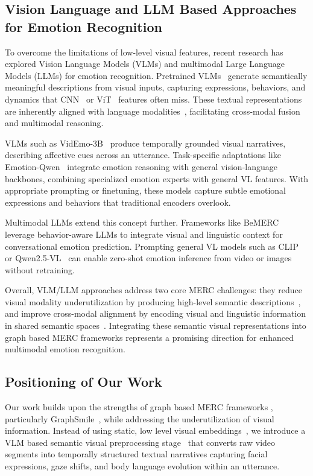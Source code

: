 \documentclass[runningheads]{llncs}
\begin{document}
\subsection{Vision Language and LLM Based Approaches for Emotion Recognition}

To overcome the limitations of low-level visual features, recent research has explored Vision Language Models (VLMs) and multimodal Large Language Models (LLMs) for emotion recognition. Pretrained VLMs~\cite{radford2021clip} generate semantically meaningful descriptions from visual inputs, capturing expressions, behaviors, and dynamics that CNN~\cite{he2016resnet} or ViT~\cite{dosovitskiy2021vit} features often miss. These textual representations are inherently aligned with language modalities~\cite{devlin2019bert}, facilitating cross-modal fusion and multimodal reasoning.

VLMs such as VidEmo-3B~\cite{videmo} produce temporally grounded visual narratives, describing affective cues across an utterance. Task-specific adaptations like Emotion-Qwen~\cite{huang2025emotionqwen} integrate emotion reasoning with general vision-language backbones, combining specialized emotion experts with general VL features. With appropriate prompting or finetuning, these models capture subtle emotional expressions and behaviors that traditional encoders overlook.

Multimodal LLMs extend this concept further. Frameworks like BeMERC~\cite{fu2025bemerc} leverage behavior-aware LLMs to integrate visual and linguistic context for conversational emotion prediction. Prompting general VL models such as CLIP~\cite{radford2021clip} or Qwen2.5-VL~\cite{qwen2_5_vl} can enable zero-shot emotion inference from video or images without retraining.

Overall, VLM/LLM approaches address two core MERC challenges: they reduce visual modality underutilization by producing high-level semantic descriptions~\cite{radford2021clip,shou2025comprehensivesurveymultimodalconversational}, and improve cross-modal alignment by encoding visual and linguistic information in shared semantic spaces~\cite{radford2021clip}. Integrating these semantic visual representations into graph based MERC frameworks represents a promising direction for enhanced multimodal emotion recognition.
\subsection{Positioning of Our Work}

Our work builds upon the strengths of graph based MERC frameworks , particularly GraphSmile~\cite{li2024graphsmile}, while addressing the underutilization of visual information. Instead of using static, low level visual embeddings~\cite{he2016resnet,baltrusaitis2018openface}, we introduce a VLM based semantic visual preprocessing stage~\cite{videmo,qwen2_5_vl} that converts raw video segments into temporally structured textual narratives capturing facial expressions, gaze shifts, and body language evolution within an utterance.
\end{document}
